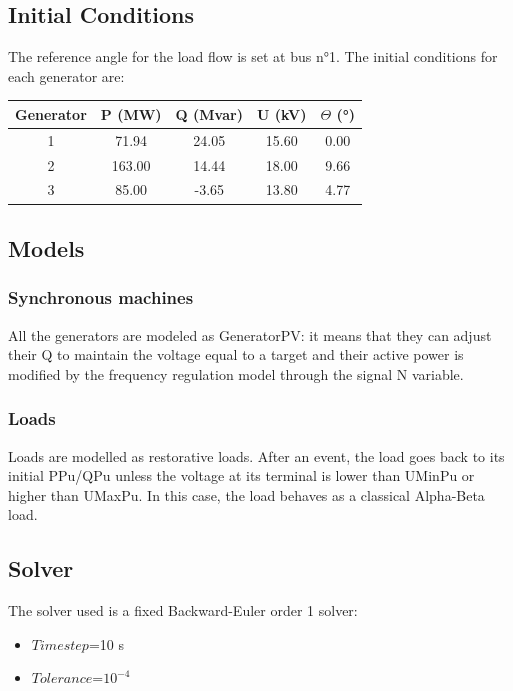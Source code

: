 \documentclass[a4paper, 12pt]{report}
\begin{document}
\subsection{Initial Conditions}

The reference angle for the load flow is set at bus n°1. The initial conditions for each generator
are:
\begin{center}
\begin{tabular}{|c|c|c|c|c|}
  \hline
  Generator & P (MW) & Q (Mvar) & U (kV) & $\Theta$ (°) \\
  \hline
  1 & 71.94 & 24.05 & 15.60 & 0.00\\
  2 & 163.00 & 14.44 & 18.00 & 9.66\\
  3 & 85.00 & -3.65 & 13.80 & 4.77\\
  \hline
\end{tabular}
\end{center}

\subsection{Models}

\subsubsection{Synchronous machines}

All the generators are modeled as GeneratorPV: it means that they can adjust their Q to maintain the voltage equal to a target and their active power is modified by the frequency regulation model through the signal N variable.

\subsubsection{Loads}

Loads are modelled as restorative loads. After an event, the load goes back to its initial PPu/QPu unless the voltage at its terminal is lower than UMinPu or higher than UMaxPu. In this case, the load behaves as a classical Alpha-Beta load.

\subsection{Solver}
The solver used is a fixed Backward-Euler order 1 solver:
\begin{itemize}
\item $Time step$=10 s
\item $Tolerance$=$10^{-4}$
\end{itemize}
\end{document}
